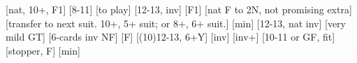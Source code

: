 \begin{bidsemi}
[nat, 10+, F1]
    [8-11]
        [to play]
    [12-13, inv]
    [F1]
    [nat F to 2N, not promising extra]
[transfer to next suit. 10+, 5+ suit; or 8+, 6+ suit.]
    [min]
        [12-13, nat inv]
        [very mild GT]
        [6-cards inv NF]
        [F]
    [(10)12-13, 6+Y]
    [inv]
    [inv+]
[10-11 or GF, fit]
    [stopper, F]
    [min]
\end{bidsemi}